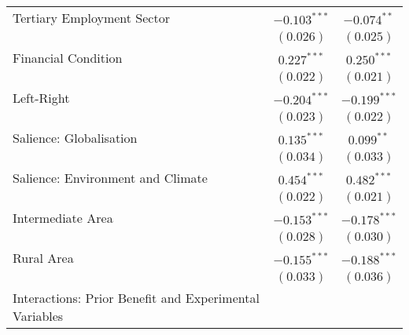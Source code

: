 \begin{center}
\begin{tiny}
\begin{longtable}{l@{} c@{} c@{}}
\quad Tertiary Employment Sector                                                                       & $-0.103^{***}$   & $-0.074^{**}$    \\
                                                                                                       & $(0.026)$        & $(0.025)$        \\
\quad Financial Condition                                                                              & $0.227^{***}$    & $0.250^{***}$    \\
                                                                                                       & $(0.022)$        & $(0.021)$        \\
\quad Left-Right                                                                                       & $-0.204^{***}$   & $-0.199^{***}$   \\
                                                                                                       & $(0.023)$        & $(0.022)$        \\
\quad Salience: Globalisation                                                                          & $0.135^{***}$    & $0.099^{**}$     \\
                                                                                                       & $(0.034)$        & $(0.033)$        \\
\quad Salience: Environment and Climate                                                                & $0.454^{***}$    & $0.482^{***}$    \\
                                                                                                       & $(0.022)$        & $(0.021)$        \\
\quad Intermediate Area                                                                                & $-0.153^{***}$   & $-0.178^{***}$   \\
                                                                                                       & $(0.028)$        & $(0.030)$        \\
\quad Rural Area                                                                                       & $-0.155^{***}$   & $-0.188^{***}$   \\
                                                                                                       & $(0.033)$        & $(0.036)$        \\
Interactions: Prior Benefit and Experimental Variables                                                 &                  &                  \\

\end{longtable}
\end{tiny}
\end{center}

